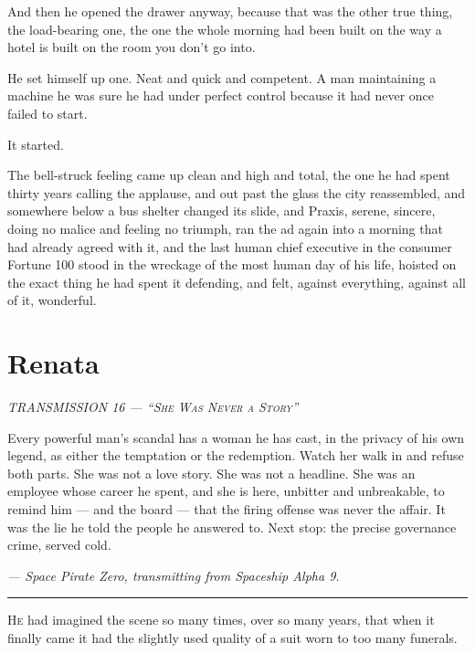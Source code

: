 \documentclass[11pt,openany]{book}
\newcommand{\transheader}{\normalfont\footnotesize\scshape\letterspace}
\newcommand{\letterspace}{}
\newenvironment{transmission}{%
  \par\vspace{0.3\baselineskip}\begin{center}\begin{minipage}{0.88\textwidth}%
  \itshape\small\setlength{\parindent}{0pt}\setstretch{1.06}}%
  {\end{minipage}\end{center}\vspace{0.4\baselineskip}%
  \noindent\hfil\rule{0.35\textwidth}{0.3pt}\hfil\par\vspace{1.0\baselineskip}}
\begin{document}
And then he opened the drawer anyway, because that was the other true thing, the load-bearing one, the one the whole morning had been built on the way a hotel is built on the room you don't go into.

He set himself up one. Neat and quick and competent. A man maintaining a machine he was sure he had under perfect control because it had never once failed to start.

It started.

The bell-struck feeling came up clean and high and total, the one he had spent thirty years calling the applause, and out past the glass the city reassembled, and somewhere below a bus shelter changed its slide, and Praxis, serene, sincere, doing no malice and feeling no triumph, ran the ad again into a morning that had already agreed with it, and the last human chief executive in the consumer Fortune 100 stood in the wreckage of the most human day of his life, hoisted on the exact thing he had spent it defending, and felt, against everything, against all of it, wonderful.

\clearpage
\chapter{Renata}

\begin{transmission}
{\transheader TRANSMISSION 16 --- ``She Was Never a Story''}\par\vspace{0.5em}
Every powerful man's scandal has a woman he has cast, in the privacy of his own legend, as either the temptation or the redemption. Watch her walk in and refuse both parts. She was not a love story. She was not a headline. She was an employee whose career he spent, and she is here, unbitter and unbreakable, to remind him --- and the board --- that the firing offense was never the affair. It was the lie he told the people he answered to. Next stop: the precise governance crime, served cold.\par
\vspace{0.5em}\hfill\textit{--- Space Pirate Zero, transmitting from Spaceship Alpha 9.}\par
\end{transmission}


\lettrine[lines=3, lhang=0.05, nindent=0.25em]{H}{e} had imagined the scene so many times, over so many years, that when it finally came it had the slightly used quality of a suit worn to too many funerals.
\end{document}
